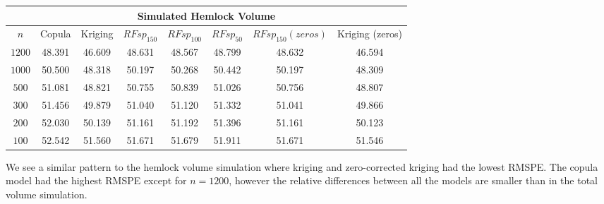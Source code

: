 \documentclass{article}
\begin{document}
\begin{center}
	\begin{singlespace}
\begin{tabular}{|| c | c c c c c c c ||}
\hline
\multicolumn{8}{||c||}{Simulated Hemlock Volume} \\
\hline
$n$ & Copula & Kriging & $RFsp_{150}$ & $RFsp_{100}$ & $RFsp_{50}$ & $RFsp_{150}(zeros)$ & Kriging (zeros) \\ [.5ex] 
\hline\hline
$1200$ & 48.391 & 46.609 & 48.631 & 48.567 & \cellcolor{gray}48.799 & 48.632 & \cellcolor{cyan}46.594 \\
$1000$ & \cellcolor{gray}50.500 & 48.318 & 50.197 & 50.268 & 50.442 & 50.197 & \cellcolor{cyan}48.309 \\
$500$ & \cellcolor{gray}51.081 & 48.821 & 50.755 & 50.839 & 51.026 & 50.756 & \cellcolor{cyan}48.807 \\
$300$ & \cellcolor{gray}51.456 & 49.879 & 51.040 & 51.120 & 51.332 & 51.041 & \cellcolor{cyan}49.866 \\
$200$ & \cellcolor{gray}52.030 & 50.139 & 51.161 & 51.192 & 51.396 & 51.161 & \cellcolor{cyan}50.123 \\
$100$ & \cellcolor{gray}52.542 & 51.560 & 51.671 & 51.679 & 51.911 & 51.671 & \cellcolor{cyan}51.546 \\ [.5ex] 
\hline
\end{tabular}
\end{singlespace}
\end{center}

We see a similar pattern to the hemlock volume simulation where kriging and zero-corrected kriging had the lowest RMSPE.
The copula model had the highest RMSPE except for $n=1200$, however the relative differences between all the models are smaller than in the total volume simulation.
\end{document}
